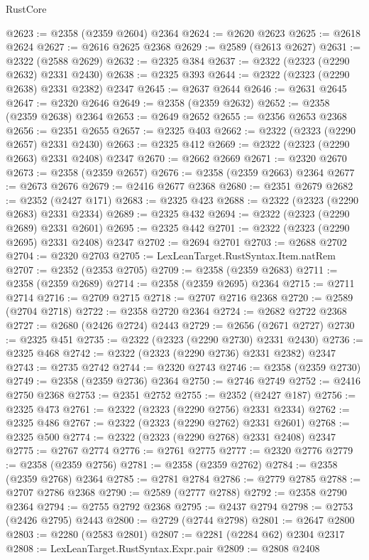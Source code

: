 \begin{lexlean}{RustCore}
\begin{coremodule}
@2623 := @2358 (@2359 @2604) @2364
@2624 := @2620 @2623
@2625 := @2618 @2624
@2627 := @2616 @2625 @2368
@2629 := @2589 (@2613 @2627)
@2631 := @2322 (@2588 @2629)
@2632 := @2325 @384
@2637 := @2322 (@2323 (@2290 @2632) @2331 @2430)
@2638 := @2325 @393
@2644 := @2322 (@2323 (@2290 @2638) @2331 @2382) @2347
@2645 := @2637 @2644
@2646 := @2631 @2645
@2647 := @2320 @2646
@2649 := @2358 (@2359 @2632)
@2652 := @2358 (@2359 @2638) @2364
@2653 := @2649 @2652
@2655 := @2356 @2653 @2368
@2656 := @2351 @2655
@2657 := @2325 @403
@2662 := @2322 (@2323 (@2290 @2657) @2331 @2430)
@2663 := @2325 @412
@2669 := @2322 (@2323 (@2290 @2663) @2331 @2408) @2347
@2670 := @2662 @2669
@2671 := @2320 @2670
@2673 := @2358 (@2359 @2657)
@2676 := @2358 (@2359 @2663) @2364
@2677 := @2673 @2676
@2679 := @2416 @2677 @2368
@2680 := @2351 @2679
@2682 := @2352 (@2427 @171)
@2683 := @2325 @423
@2688 := @2322 (@2323 (@2290 @2683) @2331 @2334)
@2689 := @2325 @432
@2694 := @2322 (@2323 (@2290 @2689) @2331 @2601)
@2695 := @2325 @442
@2701 := @2322 (@2323 (@2290 @2695) @2331 @2408) @2347
@2702 := @2694 @2701
@2703 := @2688 @2702
@2704 := @2320 @2703
@2705 := LexLeanTarget.RustSyntax.Item.natRem
@2707 := @2352 (@2353 @2705)
@2709 := @2358 (@2359 @2683)
@2711 := @2358 (@2359 @2689)
@2714 := @2358 (@2359 @2695) @2364
@2715 := @2711 @2714
@2716 := @2709 @2715
@2718 := @2707 @2716 @2368
@2720 := @2589 (@2704 @2718)
@2722 := @2358 @2720 @2364
@2724 := @2682 @2722 @2368
@2727 := @2680 (@2426 @2724) @2443
@2729 := @2656 (@2671 @2727)
@2730 := @2325 @451
@2735 := @2322 (@2323 (@2290 @2730) @2331 @2430)
@2736 := @2325 @468
@2742 := @2322 (@2323 (@2290 @2736) @2331 @2382) @2347
@2743 := @2735 @2742
@2744 := @2320 @2743
@2746 := @2358 (@2359 @2730)
@2749 := @2358 (@2359 @2736) @2364
@2750 := @2746 @2749
@2752 := @2416 @2750 @2368
@2753 := @2351 @2752
@2755 := @2352 (@2427 @187)
@2756 := @2325 @473
@2761 := @2322 (@2323 (@2290 @2756) @2331 @2334)
@2762 := @2325 @486
@2767 := @2322 (@2323 (@2290 @2762) @2331 @2601)
@2768 := @2325 @500
@2774 := @2322 (@2323 (@2290 @2768) @2331 @2408) @2347
@2775 := @2767 @2774
@2776 := @2761 @2775
@2777 := @2320 @2776
@2779 := @2358 (@2359 @2756)
@2781 := @2358 (@2359 @2762)
@2784 := @2358 (@2359 @2768) @2364
@2785 := @2781 @2784
@2786 := @2779 @2785
@2788 := @2707 @2786 @2368
@2790 := @2589 (@2777 @2788)
@2792 := @2358 @2790 @2364
@2794 := @2755 @2792 @2368
@2795 := @2437 @2794
@2798 := @2753 (@2426 @2795) @2443
@2800 := @2729 (@2744 @2798)
@2801 := @2647 @2800
@2803 := @2280 (@2583 @2801)
@2807 := @2281 (@2284 @62) @2304 @2317
@2808 := LexLeanTarget.RustSyntax.Expr.pair
@2809 := @2808 @2408

\end{coremodule}
\end{lexlean}
